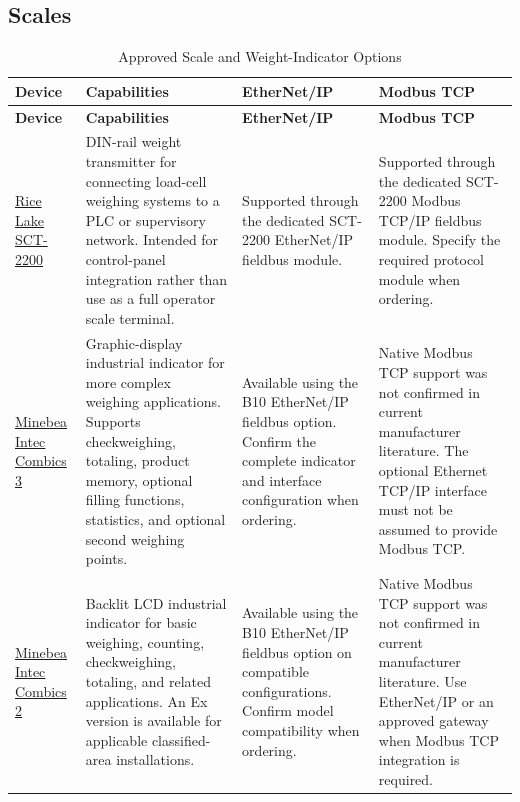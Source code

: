 \subsection{Scales}
\begin{small}
\setlength{\tabcolsep}{4pt}
\begin{longtable}{@{}p{2.5cm}p{4.2cm}p{3cm}p{3cm}@{}}
\caption{Approved Scale and Weight-Indicator Options}\label{tab:scales} \\
\toprule
\rowcolor{tblhead}\textbf{Device} & \textbf{Capabilities} & \textbf{EtherNet/IP} & \textbf{Modbus TCP} \\
\midrule
\endfirsthead
\toprule
\rowcolor{tblhead}\textbf{Device} & \textbf{Capabilities} & \textbf{EtherNet/IP} & \textbf{Modbus TCP} \\
\midrule
\endhead
\href{https://www.ricelake.com/resources/catalogs/sct-2200-catalog-page}{Rice Lake SCT-2200} & DIN-rail weight transmitter for connecting load-cell weighing systems to a PLC or supervisory network. Intended for control-panel integration rather than use as a full operator scale terminal. & Supported through the dedicated SCT-2200 EtherNet/IP fieldbus module. & Supported through the dedicated SCT-2200 Modbus TCP/IP fieldbus module. Specify the required protocol module when ordering. \\
\href{https://www.minebea-intec.com/en/industrial-scales/weight-indicators/weight-indicator-combics}{Minebea Intec Combics 3} & Graphic-display industrial indicator for more complex weighing applications. Supports checkweighing, totaling, product memory, optional filling functions, statistics, and optional second weighing points. & Available using the B10 EtherNet/IP fieldbus option. Confirm the complete indicator and interface configuration when ordering. & Native Modbus TCP support was not confirmed in current manufacturer literature. The optional Ethernet TCP/IP interface must not be assumed to provide Modbus TCP. \\
\href{https://www.minebea-intec.com/en/industrial-scales/weight-indicators/weight-indicator-combics}{Minebea Intec Combics 2} & Backlit LCD industrial indicator for basic weighing, counting, checkweighing, totaling, and related applications. An Ex version is available for applicable classified-area installations. & Available using the B10 EtherNet/IP fieldbus option on compatible configurations. Confirm model compatibility when ordering. & Native Modbus TCP support was not confirmed in current manufacturer literature. Use EtherNet/IP or an approved gateway when Modbus TCP integration is required. \\
\bottomrule
\end{longtable}
\end{small}
